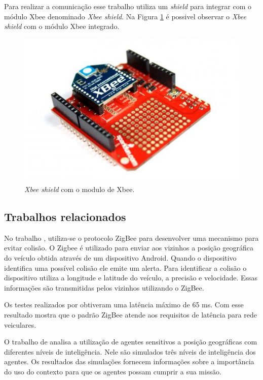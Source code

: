 Para realizar a comunicação esse trabalho utiliza um \emph{shield} para integrar com o módulo Xbee denominado \emph{Xbee shield}. Na Figura \ref{fig:xbeeShieldXbee} é possivel observar o \emph{Xbee shield} com o módulo Xbee integrado.   

\begin{figure}[htbp]
	\centering
		\includegraphics[scale=0.3]{referencial/figuras/xbee-shield.jpg}
	\caption{\emph{Xbee shield} com o modulo de Xbee.}
	\label{fig:xbeeShieldXbee}
\end{figure}

\subsection{Trabalhos relacionados}

No trabalho \cite{santanaMestrado:2014}, utiliza-se o protocolo ZigBee para desenvolver uma mecanismo para evitar colisão. O Zigbee é utilizado para enviar aos vizinhos a posição geográfica do veículo obtida através de um dispositivo Android. Quando o dispositivo identifica uma possível colisão ele emite um alerta. Para identificar a colisão o dispositivo utiliza a longitude e latitude do veículo, a precisão e velocidade. Essas informações são transmitidas pelos vizinhos utilizando o ZigBee.

Os testes realizados por \cite{santanaMestrado:2014} obtiveram uma latência máximo de 65 ms. Com esse resultado mostra que o padrão ZigBee atende aos requisitos de latência para rede veiculares.

O trabalho de \cite{Freitas:2011} analisa a utilização de agentes sensitivos a posição geográficas com diferentes níveis de inteligência. Nele são simulados três níveis de inteligência dos agentes. Os resultados das simulações fornecem informações sobre a importância do uso do contexto para que os agentes possam cumprir a sua missão. 
